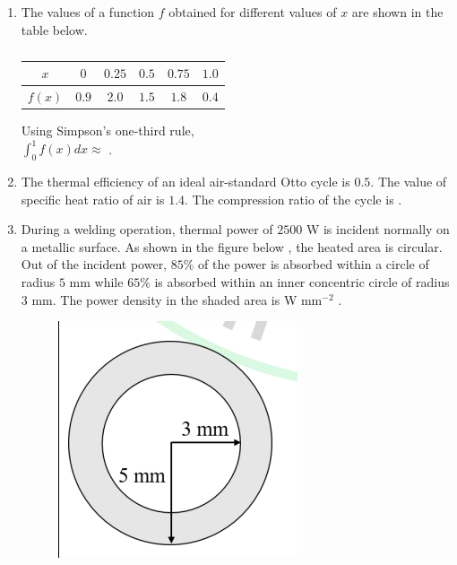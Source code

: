\documentclass[journal]{IEEEtran}
\begin{document}
\begin{enumerate}[leftmargin=0pt]
\item
The values of a function $f$ obtained for different values of $x$ are shown in the table below.

\begin{table}[ht]
\centering
\caption*{}
\label{tab:simpson}
\begin{tabular}{|c|c|c|c|c|c|}
\hline
$x$ & $0$ & $0.25$ & $0.5$ & $0.75$ & $1.0$ \\
\hline
$f(x)$ & $0.9$ & $2.0$ & $1.5$ & $1.8$ & $0.4$ \\
\hline
\end{tabular}
\end{table}

Using Simpson's one-third rule,\\
$\displaystyle \int_0^1 f(x) dx \approx$ \underline{\hspace{2cm}} .

\hfill{}

\item
The thermal efficiency of an ideal air-standard Otto cycle is $0.5$. The value of specific heat ratio of air is $1.4$. The compression ratio of the cycle is \underline{\hspace{2cm}} .

\hfill{}

\item
During a welding operation, thermal power of $2500$ W is incident normally on a metallic surface. As shown in the figure below , the heated area is circular. Out of the incident power, $85\%$ of the power is absorbed within a circle of radius $5$ mm while $65\%$ is absorbed within an inner concentric circle of radius $3$ mm. The power density in the shaded area is \underline{\hspace{2cm}} W mm$^{-2}$ .
\begin{figure}[H]\includegraphics[width=0.5\columnwidth]{Figs/image - 2025-08-24T163425.703.png}\caption*{}\label{fig:q33}\end{figure}
\hfill{}


\end{enumerate}
\end{document}

